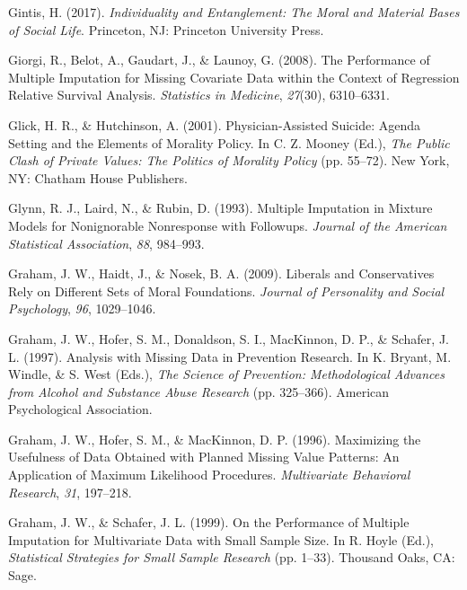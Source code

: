 \documentclass[12pt,econ]{sources/authesis}
\begin{document}
\leavevmode\hypertarget{ref-gintis_2017_individuality}{}%
Gintis, H. (2017). \emph{Individuality and Entanglement: The Moral and Material Bases of Social Life}. Princeton, NJ: Princeton University Press.

\leavevmode\hypertarget{ref-giorgi_2008_performance}{}%
Giorgi, R., Belot, A., Gaudart, J., \& Launoy, G. (2008). The Performance of Multiple Imputation for Missing Covariate Data within the Context of Regression Relative Survival Analysis. \emph{Statistics in Medicine}, \emph{27}(30), 6310--6331.

\leavevmode\hypertarget{ref-glick_2001_physician-assisted}{}%
Glick, H. R., \& Hutchinson, A. (2001). Physician-Assisted Suicide: Agenda Setting and the Elements of Morality Policy. In C. Z. Mooney (Ed.), \emph{The Public Clash of Private Values: The Politics of Morality Policy} (pp. 55--72). New York, NY: Chatham House Publishers.

\leavevmode\hypertarget{ref-glynn_1993_multiple}{}%
Glynn, R. J., Laird, N., \& Rubin, D. (1993). Multiple Imputation in Mixture Models for Nonignorable Nonresponse with Followups. \emph{Journal of the American Statistical Association}, \emph{88}, 984--993.

\leavevmode\hypertarget{ref-graham_2009_liberals}{}%
Graham, J. W., Haidt, J., \& Nosek, B. A. (2009). Liberals and Conservatives Rely on Different Sets of Moral Foundations. \emph{Journal of Personality and Social Psychology}, \emph{96}, 1029--1046.

\leavevmode\hypertarget{ref-graham_1997_analysis}{}%
Graham, J. W., Hofer, S. M., Donaldson, S. I., MacKinnon, D. P., \& Schafer, J. L. (1997). Analysis with Missing Data in Prevention Research. In K. Bryant, M. Windle, \& S. West (Eds.), \emph{The Science of Prevention: Methodological Advances from Alcohol and Substance Abuse Research} (pp. 325--366). American Psychological Association.

\leavevmode\hypertarget{ref-graham_1996_maximizing}{}%
Graham, J. W., Hofer, S. M., \& MacKinnon, D. P. (1996). Maximizing the Usefulness of Data Obtained with Planned Missing Value Patterns: An Application of Maximum Likelihood Procedures. \emph{Multivariate Behavioral Research}, \emph{31}, 197--218.

\leavevmode\hypertarget{ref-graham_1999_performance}{}%
Graham, J. W., \& Schafer, J. L. (1999). On the Performance of Multiple Imputation for Multivariate Data with Small Sample Size. In R. Hoyle (Ed.), \emph{Statistical Strategies for Small Sample Research} (pp. 1--33). Thousand Oaks, CA: Sage.
\end{document}
